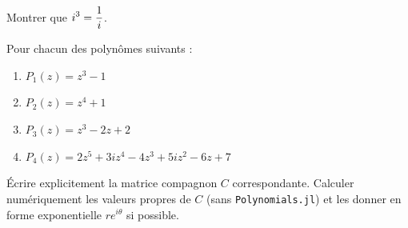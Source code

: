 \begin{exercise}
    Montrer que $\displaystyle i^3 = \frac1i$.
\end{exercise}

\begin{exercise}
    Pour chacun des polynômes suivants :

    \begin{enumerate}[label=(\alph*)]
        \item \(P_1(z) = z^3 - 1\)
        \item \(P_2(z) = z^4 + 1\)
        \item \(P_3(z) = z^3 - 2z + 2\)
        \item \(P_4(z) = 2z^5 + 3i z^4 - 4z^3 + 5i z^2 - 6z + 7\)
    \end{enumerate}
    Écrire explicitement la matrice compagnon \(C\) correspondante. Calculer numériquement les valeurs propres de \(C\) (sans \texttt{Polynomials.jl}) et les donner en forme exponentielle \(re^{i\theta}\) si possible.
\end{exercise}

